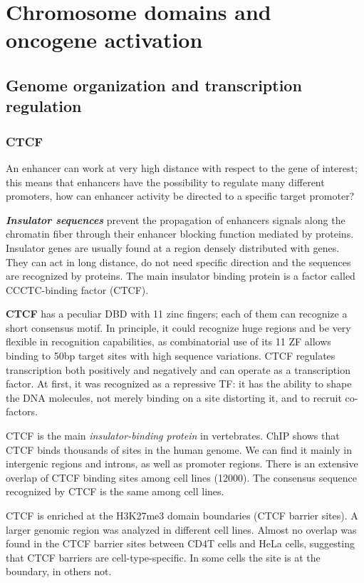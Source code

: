 \graphicspath{{chapters/_resources/}}

\chapter{Chromosome domains and oncogene activation}

\section{Genome organization and transcription regulation}

\subsection{CTCF}
An enhancer can work at very high distance with respect to the gene of interest; this means that enhancers have the possibility to regulate many different promoters, how can enhancer activity be directed to a specific target promoter?

\textbf{\emph{Insulator sequences}} prevent the propagation of enhancers signals along the chromatin fiber through their enhancer blocking function mediated by proteins. Insulator genes are usually found at a region densely distributed with genes. They can act in long distance, do not need specific direction and the sequences are recognized by proteins. The main insulator binding protein is a factor called CCCTC-binding factor (CTCF).

\textbf{CTCF} has a peculiar DBD with 11 zinc fingers; each of them can recognize a short consensus motif. In principle, it could recognize huge regions and be very flexible in recognition capabilities, as combinatorial use of its 11 ZF allows binding to 50bp target sites with high sequence variations. CTCF regulates transcription both positively and negatively and can operate as a transcription factor. At first, it was recognized as a repressive TF: it has the ability to shape the DNA molecules, not merely binding on a site distorting it, and to recruit co-factors.

CTCF is the main \emph{insulator-binding protein} in vertebrates. ChIP shows that CTCF binds thousands of sites in the human genome. We can find it mainly in intergenic regions and introns, as well as promoter regions. There is an extensive overlap of CTCF binding sites among cell lines (12000). The consensus sequence recognized by CTCF is the same among cell lines.

CTCF is enriched at the H3K27me3 domain boundaries (CTCF barrier sites). A larger genomic region was analyzed in different cell lines. Almost no overlap was found in the CTCF barrier sites between CD4T cells and HeLa cells, suggesting that CTCF barriers are cell-type-specific. In some cells the site is at the boundary, in others not.

